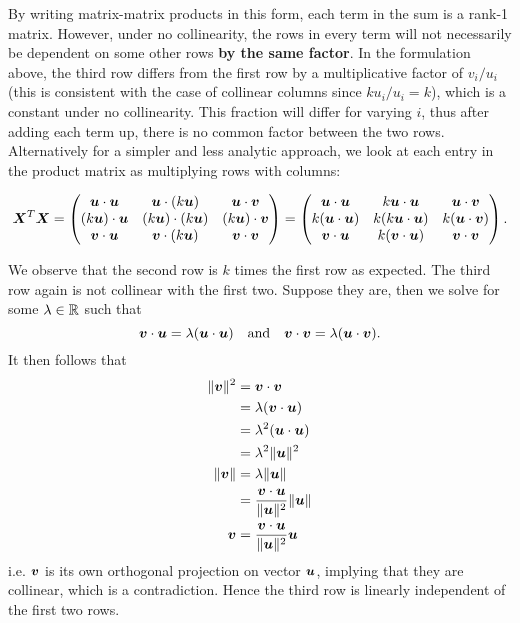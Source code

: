 \documentclass[12pt]{article}
\begin{document}
	By writing matrix-matrix products in this form, each term in the sum is a rank-1 matrix. However, under no collinearity, the rows in every term will not necessarily be dependent on some other rows \textbf{by the same factor}. In the formulation above, the third row differs from the first row by a multiplicative factor of $v_i/u_i$ (this is consistent with the case of collinear columns since $ku_i/u_i=k$), which is a constant under no collinearity. This fraction will differ for varying $i$, thus after adding each term up, there is no common factor between the two rows.\\
	
	Alternatively for a simpler and less analytic approach, we look at each entry in the product matrix as multiplying rows with columns:
	
	$$\boldsymbol{X}^T\boldsymbol{X}=\begin{pmatrix}
		\boldsymbol{u}\cdot\boldsymbol{u} & \boldsymbol{u}\cdot(k\boldsymbol{u}) & \boldsymbol{u}\cdot\boldsymbol{v}\\
		(k\boldsymbol{u})\cdot\boldsymbol{u} & (k\boldsymbol{u})\cdot(k\boldsymbol{u}) & (k\boldsymbol{u})\cdot\boldsymbol{v} \\
		\boldsymbol{v}\cdot\boldsymbol{u} & \boldsymbol{v}\cdot(k\boldsymbol{u}) & \boldsymbol{v}\cdot\boldsymbol{v}
	\end{pmatrix}=\begin{pmatrix}
		\boldsymbol{u}\cdot\boldsymbol{u} & k\boldsymbol{u}\cdot\boldsymbol{u} & \boldsymbol{u}\cdot\boldsymbol{v}\\
		k(\boldsymbol{u}\cdot\boldsymbol{u}) & k(k\boldsymbol{u}\cdot\boldsymbol{u}) & k(\boldsymbol{u}\cdot\boldsymbol{v}) \\
		\boldsymbol{v}\cdot\boldsymbol{u} & k(\boldsymbol{v}\cdot\boldsymbol{u}) & \boldsymbol{v}\cdot\boldsymbol{v}
	\end{pmatrix}.$$
	
	We observe that the second row is $k$ times the first row as expected. The third row again is not collinear with the first two. Suppose they are, then we solve for some $\lm\in\RR$ such that
	$$\boldsymbol{v}\cdot\boldsymbol{u}=\lambda(\boldsymbol{u}\cdot\boldsymbol{u}) \quad \text{and}\quad \boldsymbol{v}\cdot\boldsymbol{v}=\lambda(\boldsymbol{u}\cdot\boldsymbol{v}).$$
	It then follows that
	\begin{align*}
		\|\boldsymbol{v}\|^2&=\boldsymbol{v}\cdot\boldsymbol{v}\\
		&=\lambda(\boldsymbol{v}\cdot\boldsymbol{u})\\
		&=\lambda^2(\boldsymbol{u}\cdot\boldsymbol{u})\\
		&=\lambda^2\|\boldsymbol{u}\|^2\\ 
		\|\boldsymbol{v}\|&=\lambda\|\boldsymbol{u}\|\\
		&=\dfrac{\boldsymbol{v}\cdot\boldsymbol{u}}{\|\boldsymbol{u}\|^2}\|\boldsymbol{u}\|\\
		\boldsymbol{v}&=\dfrac{\boldsymbol{v}\cdot\boldsymbol{u}}{\|\boldsymbol{u}\|^2}\boldsymbol{u}
	\end{align*}
	$$$$
	i.e. $\boldsymbol{v}$ is its own orthogonal projection on vector $\boldsymbol{u}$, implying that they are collinear, which is a contradiction. Hence the third row is linearly independent of the first two rows. \\
	
\end{document}
